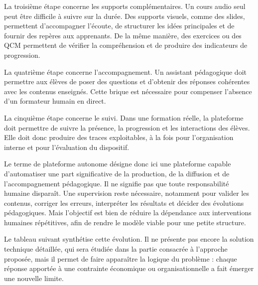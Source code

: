 La troisième étape concerne les supports complémentaires. Un cours audio seul peut être
difficile à suivre sur la durée. Des supports visuels, comme des slides, permettent
d'accompagner l'écoute, de structurer les idées principales et de fournir des repères aux
apprenants. De la même manière, des exercices ou des QCM permettent de vérifier la
compréhension et de produire des indicateurs de progression.

La quatrième étape concerne l'accompagnement. Un assistant pédagogique doit permettre
aux élèves de poser des questions et d'obtenir des réponses cohérentes avec les contenus
enseignés. Cette brique est nécessaire pour compenser l'absence d'un formateur humain
en direct.

La cinquième étape concerne le suivi. Dans une formation réelle, la plateforme doit
permettre de suivre la présence, la progression et les interactions des élèves. Elle doit
donc produire des traces exploitables, à la fois pour l'organisation interne et pour
l'évaluation du dispositif.

Le terme de plateforme autonome désigne donc ici une plateforme capable d'automatiser
une part significative de la production, de la diffusion et de l'accompagnement pédagogique.
Il ne signifie pas que toute responsabilité humaine disparaît. Une supervision reste
nécessaire, notamment pour valider les contenus, corriger les erreurs, interpréter les
résultats et décider des évolutions pédagogiques. Mais l'objectif est bien de réduire la
dépendance aux interventions humaines répétitives, afin de rendre le modèle viable pour
une petite structure.

Le tableau suivant synthétise cette évolution. Il ne présente pas encore la solution
technique détaillée, qui sera étudiée dans la partie consacrée à l'approche proposée, mais
il permet de faire apparaître la logique du problème : chaque réponse apportée à une
contrainte économique ou organisationnelle a fait émerger une nouvelle limite.

